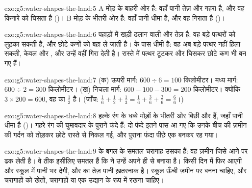 \begin{solution}{exo:g5:water-shapes-the-land:5}
A मोड़ के बाहरी ओर है: वहाँ पानी तेज़ और गहरा है, और वह किनारे को घिसता है
()। B मोड़ के भीतरी ओर है: वहाँ पानी धीमा है, और वह  गिराता है
()।
\end{solution}

\begin{solution}{exo:g5:water-shapes-the-land:6}
पहाड़ों में  खड़ी ढलान वाली और तेज़ है: वह बड़े पत्थरों को लुढ़का सकती है, और
छोटे कणों को बहा ले जाती है।  के पास  धीमी है: वह अब बड़े पत्थर नहीं
हिला सकती, केवल  और , और उन्हें वहीं गिरा देती है। रास्ते में पत्थर
टूटकर और घिसकर छोटे कण भी बन गए
हैं।
\end{solution}

\begin{solution}{exo:g5:water-shapes-the-land:7}
(क) ऊपरी मार्ग: $600 \div 6 = 100$ किलोमीटर। मध्य मार्ग:
$600 \div 2 = 300$ किलोमीटर। (ख) निचला मार्ग: $600 - 100 - 300 = 200$
किलोमीटर। क्योंकि $3 \times 200 = 600$, वह  का $\frac{1}{3}$ है।
(जाँच: $\frac{1}{6} + \frac{1}{2} + \frac{1}{3} = \frac{1}{6} +
\frac{3}{6} + \frac{2}{6} = \frac{6}{6}$।)
\end{solution}

\begin{solution}{exo:g5:water-shapes-the-land:8}
हल्के रंग के धब्बे मोड़ों के भीतरी ओर बिछी  और  हैं, जहाँ पानी धीमा है
()। गहरे रंग की घुमावदार   के पुराने फंदे हैं: दो फंदे इतने पास आ
गए कि  उनके बीच की ज़मीन की गर्दन को तोड़कर छोटे रास्ते से निकल गई, और पुराना
फंदा पीछे एक  बनकर
रह गया।
\end{solution}

\begin{solution}{exo:g5:water-shapes-the-land:9}
 के बगल के समतल चरागाह उसका  हैं: वह ज़मीन जिसे   आने पर
ढक लेती है। वे ठीक इसीलिए समतल हैं कि  ने उन्हें अपने ही  से बनाया है।
किसी दिन  में फिर  आएगी और स्कूल में पानी भर देगी, और  का तेज़ पानी
ख़तरनाक है। स्कूल ऊँची ज़मीन पर बनना चाहिए, और चरागाहों को खेतों, चरागाहों या
एक उद्यान के रूप में रखना चाहिए।
\end{solution}

